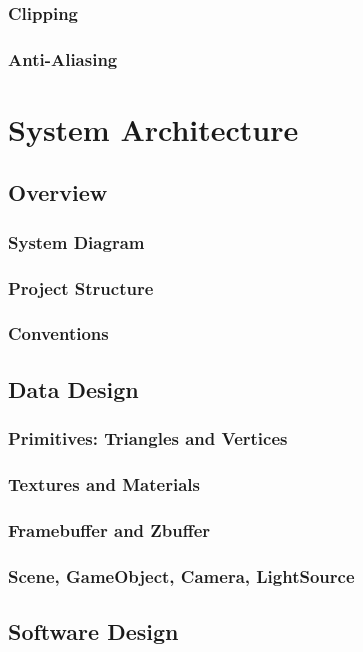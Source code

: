 \documentclass{article}
\begin{document}
{\subsubsection{Clipping}
\subsubsection{Anti-Aliasing}

\section{System Architecture}

\subsection{Overview}
\subsubsection{System Diagram}
\subsubsection{Project Structure}
\subsubsection{Conventions}

\subsection{Data Design}
\subsubsection{Primitives: Triangles and Vertices}
\subsubsection{Textures and Materials}
\subsubsection{Framebuffer and Zbuffer}
\subsubsection{Scene, GameObject, Camera, LightSource}

\subsection{Software Design}
}
\end{document}
